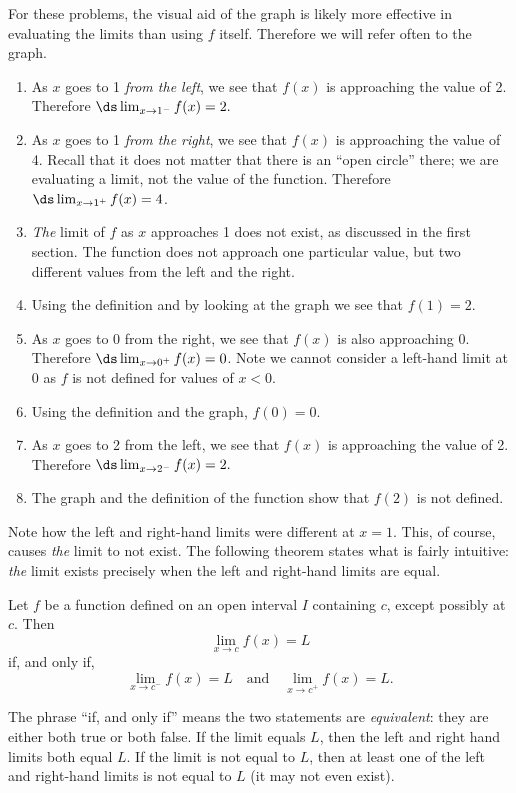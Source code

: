 {For these problems, the visual aid of the graph is likely more effective in evaluating the limits than using $f$ itself. Therefore we will refer often to the graph.
\begin{enumerate}
	\item	As $x$ goes to 1 \textit{from the left}, we see that $f(x)$ is approaching the value of 2. Therefore $\ds \lim_{x\to 1^-} f(x) =2.$
	\item	As $x$ goes to 1 \textit{from the right}, we see that $f(x)$ is approaching the value of 4. Recall that it does not matter that there is an ``open circle'' there; we are evaluating a limit, not the value of the function. Therefore $\ds \lim_{x\to 1^+} f(x)=4$.
	\item	\textit{The} limit of $f$ as $x$ approaches 1 does not exist, as discussed in the first section. The function does not approach one particular value, but two different values from the left and the right.
	\item	Using the definition and by looking at the graph we see that $f(1) = 2$.
	\item	As $x$ goes to 0 from the right, we see that $f(x)$ is also approaching 0. Therefore $\ds \lim_{x\to 0^+} f(x)=0$. Note we cannot consider a left-hand limit at 0 as $f$ is not defined for values of $x<0$.
	\item	Using the definition and the graph, $f(0) = 0$.
	\item	As $x$ goes to 2 from the left, we see that $f(x)$ is approaching the value of 2. Therefore $\ds \lim_{x\to 2^-} f(x)=2.$
	\item	The graph and the definition of the function show that $f(2)$ is not defined.\eoehere
\end{enumerate}}

Note how the left and right-hand limits were different at $x=1$. This, of course, causes \textit{the} limit to not exist. The following theorem states what is fairly intuitive: \textit{the} limit exists precisely when the left and right-hand limits are equal.

{Let $f$ be a function defined on an open interval $I$ containing $c$, except possibly at $c$.  Then \[\lim_{x\to c}f(x) = L\] if, and only if, \[\lim_{x\to c^-}f(x) = L \quad \text{and} \quad \lim_{x\to c^+}f(x) = L.\]}

The phrase ``if, and only if'' means the two statements are \textit{equivalent}: they are either both true or both false. If the limit equals $L$, then the left and right hand limits both equal $L$. If the limit is not equal to $L$, then at least one of the left and right-hand limits is not equal to $L$ (it may not even exist).
			
